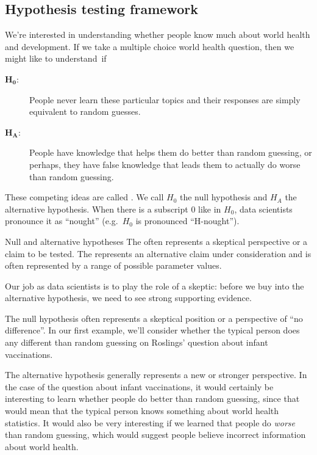 \subsection{Hypothesis testing framework}

We're interested in understanding whether people know much
about world health and development. If we take a multiple choice
world health question, then we might like to understand~if
\begin{description}
\item[$\mathbf{H_0}$:]
    People never learn these particular topics and their
    responses are simply equivalent to random guesses.
\item[$\mathbf{H_A}$:]
    People have knowledge that helps them do better
    than random guessing, or perhaps, they have false knowledge
    that leads them to actually do worse than random guessing.
\end{description}
These competing ideas are called .
We call $H_0$ the null hypothesis and $H_A$ the alternative
hypothesis.
When there is a subscript 0 like in $H_0$,
data scientists pronounce it as ``nought''
(e.g.~$H_0$ is pronounced ``H-nought'').

\begin{onebox}{Null and alternative hypotheses}
  The  often represents
  a skeptical perspective or a claim to be tested.
  The  represents an
  alternative claim under consideration and is often
  represented by a range of possible parameter values.
  \stdvspace{}
  
  Our job as data scientists is to play the role of a skeptic:
  before we buy into the alternative hypothesis, we need to
  see strong supporting evidence.
\end{onebox}

The null hypothesis often represents a skeptical position
or a perspective of ``no difference''.
In our first example, we'll consider whether
the typical person does any different than random guessing
on Roslings' question about infant vaccinations.

The alternative hypothesis generally represents a new
or stronger perspective. In the case of the question
about infant vaccinations,
it would certainly be interesting to learn whether
people do better than random guessing, since that would
mean that the typical person knows something about
world health statistics.
It would also be very interesting if we learned
that people do \emph{worse} than random guessing,
which would suggest people believe
incorrect information about world health.


